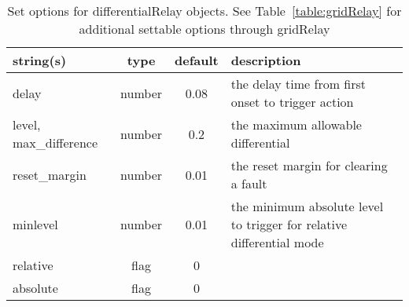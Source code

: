 \begin{table}[ht]
\centering
\begin{tabular}{p{5cm} c c p{7cm}}
\hline
string(s) & type & default & description \\
\hline
delay & number & 0.08 & the delay time from first onset to trigger action\\
level, max\_difference & number & 0.2 & the maximum allowable differential\\
reset\_margin & number & 0.01 & the reset margin for clearing a fault\\
minlevel & number & 0.01 & the minimum absolute level to trigger for relative differential mode\\
relative & flag & 0 & \\
absolute & flag & 0 & \\
\hline
\end{tabular}
\caption{Set options for differentialRelay objects. See Table~\ref{table:gridRelay} for additional settable options through gridRelay}
\label{table:differentialRelay}
\end{table}

